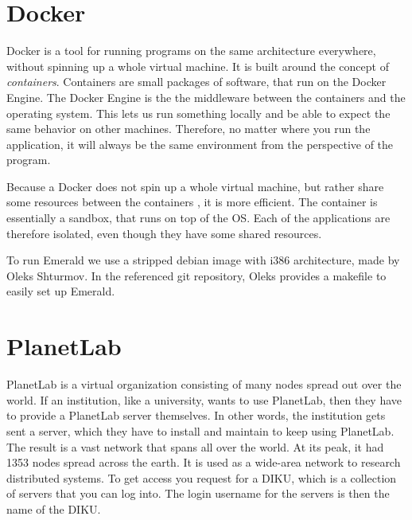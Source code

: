 
\section{Docker}\label{background:docker}
Docker is a tool for running programs on the same architecture everywhere, without spinning up a whole virtual machine. It is built around the concept of \textit{containers}. Containers are small packages of software, that run on the Docker Engine. The Docker Engine is the the middleware between the containers and the operating system. This lets us run something locally and be able to expect the same behavior on other machines. Therefore, no matter where you run the application, it will always be the same environment from the perspective of the program. 

Because a Docker does not spin up a whole virtual machine, but rather share some resources between the containers \cite{dockercom_what_nodate}, it is more efficient. The container is essentially a sandbox, that runs on top of the OS. Each of the applications are therefore isolated, even though they have some shared resources.

To run Emerald we use a stripped debian image with i386 architecture, made by Oleks Shturmov\cite{oleks_oleksdocker-in5570v21_2021}.
In the referenced git repository, Oleks provides a makefile to easily set up Emerald.



\section{PlanetLab}
PlanetLab is a virtual organization consisting of many nodes spread out over the world. If an institution, like a university, wants to use PlanetLab, then they have to provide a PlanetLab server themselves. In other words, the institution gets sent a server, which they have to install and maintain to keep using PlanetLab. The result is a vast network that spans all over the world. At its peak, it had 1353 nodes spread across the earth\cite{noauthor_planetlab_nodate}. It is used as a wide-area network to research distributed systems. To get access you request for a DIKU, which is a collection of servers that you can log into. The login username for the servers is then the name of the DIKU.

